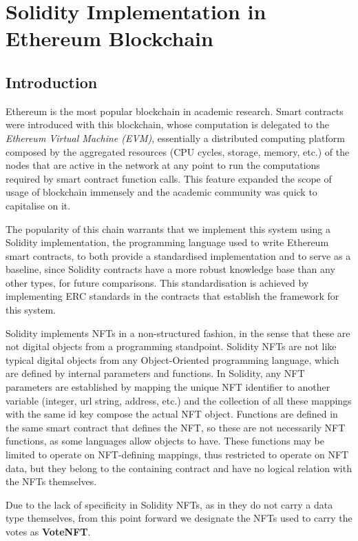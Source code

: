\documentclass[../main.tex]{subfiles}
\begin{document}
\section{Solidity Implementation in Ethereum Blockchain}
\label{sec:solidity_implementation}
\subsection{Introduction}
Ethereum is the most popular blockchain in academic research. Smart contracts were introduced with this blockchain, whose computation is delegated to the \textit{Ethereum Virtual Machine (EVM)}, essentially a distributed computing platform composed by the aggregated resources (CPU cycles, storage, memory, etc.) of the nodes that are active in the network at any point to run the computations required by smart contract function calls. This feature expanded the scope of usage of blockchain immensely and the academic community was quick to capitalise on it.
\par
The popularity of this chain warrants that we implement this system using a Solidity implementation, the programming language used to write Ethereum smart contracts, to both provide a standardised implementation and to serve as a baseline, since Solidity contracts have a more robust knowledge base than any other types, for future comparisons. This standardisation is achieved by implementing ERC standards in the contracts that establish the framework for this system.
\par
Solidity implements NFTs in a non-structured fashion, in the sense that these are not digital objects from a programming standpoint. Solidity NFTs are not like typical digital objects from any Object-Oriented programming language, which are defined by internal parameters and functions. In Solidity, any NFT parameters are established by mapping the unique NFT identifier to another variable (integer, url string, address, etc.) and the collection of all these mappings with the same id key compose the actual NFT object. Functions are defined in the same smart contract that defines the NFT, so these are not necessarily NFT functions, as some languages allow objects to have. These functions may be limited to operate on NFT-defining mappings, thus restricted to operate on NFT data, but they belong to the containing contract and have no logical relation with the NFTs themselves.
\par
Due to the lack of specificity in Solidity NFTs, as in they do not carry a data type themselves, from this point forward we designate the NFTs used to carry the votes as \textbf{VoteNFT}.
\end{document}
